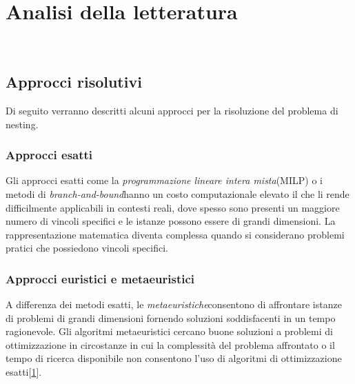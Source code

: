 \chapter{Analisi della letteratura}
\label{cap:descrizione-stage}

\\

\section{Approcci risolutivi}

Di seguito verranno descritti alcuni approcci per la risoluzione del problema di nesting.

\subsection{Approcci esatti}

Gli approcci esatti come la \emph{programmazione lineare intera mista}\glsfirstoccur (MILP) o i metodi di \emph{branch-and-bound}\glsfirstoccur hanno un costo computazionale elevato il che li rende difficilmente applicabili in contesti reali, dove spesso sono presenti un maggiore numero di vincoli specifici e le istanze possono essere di grandi dimensioni. La rappresentazione matematica diventa complessa quando si considerano problemi pratici che possiedono vincoli specifici.

\subsection{Approcci euristici e metaeuristici} \hypertarget{metaeuristiche}{}

A differenza dei metodi esatti, le \emph{metaeuristiche}\glsfirstoccur consentono di affrontare istanze di problemi di grandi dimensioni fornendo soluzioni soddisfacenti in un tempo ragionevole. Gli algoritmi metaeuristici cercano buone soluzioni a problemi di ottimizzazione in circostanze in cui la complessità del problema affrontato o il tempo di ricerca disponibile non consentono l'uso di algoritmi di ottimizzazione esatti[\hyperlink{bibliografia}{1}].


